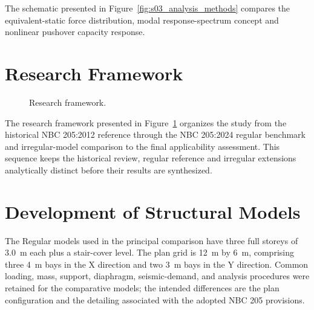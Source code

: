 
The schematic presented in Figure~\ref{fig:s03_analysis_methods} compares the equivalent-static force distribution, modal response-spectrum concept and nonlinear pushover capacity response.

\section{Research Framework}
\begin{figure}[htbp]
\centering
{}
\caption{Research framework.}
\label{fig:research_workflow}
\end{figure}

The research framework presented in Figure~\ref{fig:research_workflow} organizes the study from the historical NBC 205:2012 reference through the NBC 205:2024 regular benchmark and irregular-model comparison to the final applicability assessment. This sequence keeps the historical review, regular reference and irregular extensions analytically distinct before their results are synthesized.


\section{Development of Structural Models}
The Regular models used in the principal comparison have three full storeys of 3.0~m each plus a stair-cover level. The plan grid is 12~m by 6~m, comprising three 4~m bays in the X direction and two 3~m bays in the Y direction. Common loading, mass, support, diaphragm, seismic-demand, and analysis procedures were retained for the comparative models; the intended differences are the plan configuration and the detailing associated with the adopted NBC 205 provisions.

